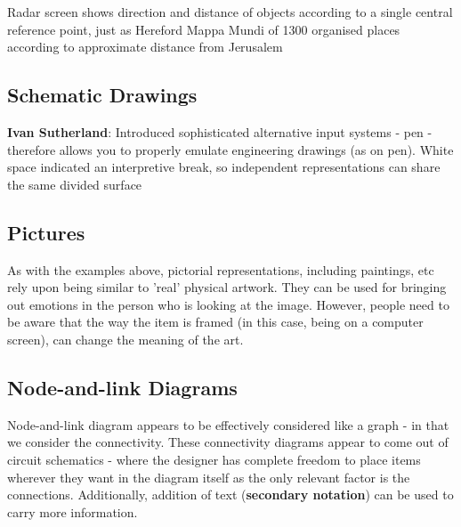 \documentclass{article}
\newenvironment{example}{\par\color{brown}}{\par}
\begin{document}
\begin{example}
Radar screen shows direction and distance of objects according to a single central reference point, just as Hereford Mappa Mundi of 1300 organised places according to approximate distance from Jerusalem
\end{example}

\subsection{Schematic Drawings}
\textbf{Ivan Sutherland}: Introduced sophisticated alternative input systems - pen - therefore allows you to properly emulate engineering drawings (as on pen). White space indicated an interpretive break, so independent representations can share the same divided surface

\subsection{Pictures}
As with the examples above, pictorial representations, including paintings, etc rely upon being similar to 'real' physical artwork. They can be used for bringing out emotions in the person who is looking at the image. However, people need to be aware that the way the item is framed (in this case, being on a computer screen), can change the meaning of the art. 

\subsection{Node-and-link Diagrams}
Node-and-link diagram appears to be effectively considered like a graph - in that we consider the connectivity. These connectivity diagrams appear to come out of circuit schematics - where the designer has complete freedom to place items wherever they want in the diagram itself as the only relevant factor is the connections. Additionally, addition of text (\textbf{secondary notation}) can be used to carry more information. 
\end{document}
